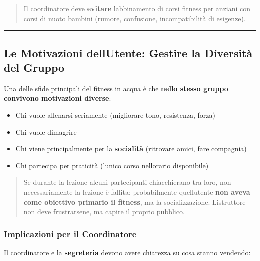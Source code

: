 \documentclass[a4paper,11pt]{article}
\providecommand{\tightlist}{%
  \setlength{\itemsep}{0pt}\setlength{\parskip}{0pt}}
\begin{document}
\begin{quote}
      Il coordinatore deve \textbf{evitare} l\textquotesingle abbinamento di
      corsi fitness per anziani con corsi di nuoto bambini (rumore,
      confusione, incompatibilità di esigenze).
\end{quote}

\begin{center}\rule{0.5\linewidth}{0.5pt}\end{center}

\subsection{Le Motivazioni dell\textquotesingle Utente: Gestire la
      Diversità del
      Gruppo}\label{le-motivazioni-dellutente-gestire-la-diversituxe0-del-gruppo}

Una delle sfide principali del fitness in acqua è che \textbf{nello
      stesso gruppo convivono motivazioni diverse}:

\begin{itemize}
      \tightlist
      \item
            Chi vuole allenarsi seriamente (migliorare tono, resistenza, forza)
      \item
            Chi vuole dimagrire
      \item
            Chi viene principalmente per la \textbf{socialità} (ritrovare amici,
            fare compagnia)
      \item
            Chi partecipa per praticità (l\textquotesingle unico corso
            nell\textquotesingle orario disponibile)
\end{itemize}

\begin{quote}
      Se durante la lezione alcuni partecipanti chiacchierano tra loro, non
      necessariamente la lezione è fallita: probabilmente
      quell\textquotesingle utente \textbf{non aveva come obiettivo primario
            il fitness}, ma la socializzazione. L\textquotesingle istruttore non
      deve frustrarsene, ma capire il proprio pubblico.
\end{quote}

\subsubsection{Implicazioni per il
      Coordinatore}\label{implicazioni-per-il-coordinatore}

Il coordinatore e la \textbf{segreteria} devono avere chiarezza su cosa
stanno vendendo:
\end{document}

